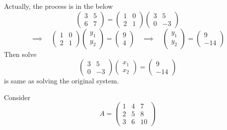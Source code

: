 Actually, the process is in the below \[
    \begin{pmatrix}
        3 & 5 \\
        6 & 7
    \end{pmatrix} = \begin{pmatrix}
        1 & 0 \\
        2 & 1
    \end{pmatrix} \begin{pmatrix}
        3 & 5 \\
        0 & -3
    \end{pmatrix}
\]  
\[
    \implies \quad \begin{pmatrix}
        1 & 0 \\
        2 & 1
    \end{pmatrix} \begin{pmatrix}
        y_1 \\
        y_2
    \end{pmatrix} = \begin{pmatrix}
        9 \\
        4
    \end{pmatrix} \quad \implies \quad \begin{pmatrix}
        y_1 \\
        y_2
    \end{pmatrix} = \begin{pmatrix}
        9 \\
        -14
    \end{pmatrix}
\]
Then solve
\[
    \begin{pmatrix}
        3 & 5 \\
        0 & -3
    \end{pmatrix} \begin{pmatrix}
        x_1 \\
        x_2
    \end{pmatrix} = \begin{pmatrix}
        9 \\
        -14
    \end{pmatrix}
\]
is same as solving the original system.

\begin{eg}
    Consider \[
        A = \begin{pmatrix}
            1 & 4 & 7 \\
            2 & 5 & 8 \\
            3 & 6 & 10
        \end{pmatrix}
    \]
\end{eg}

